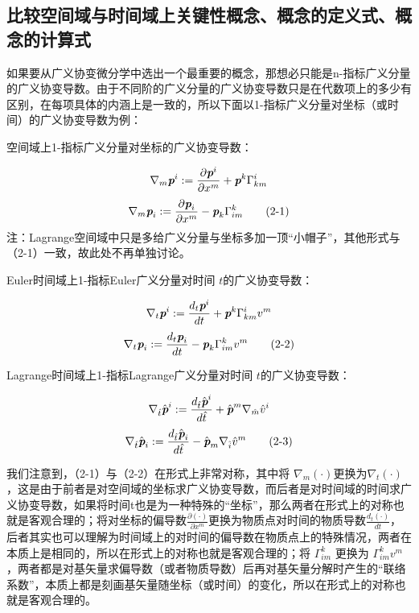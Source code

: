 \documentclass[UTF8]{ctexart}
\begin{document}
\subsection{比较空间域与时间域上关键性概念、概念的定义式、概念的计算式}
如果要从广义协变微分学中选出一个最重要的概念，那想必只能是n-指标广义分量的广义协变导数。由于不同阶的广义分量的广义协变导数只是在代数项上的多少有区别，在每项具体的内涵上是一致的，所以下面以1-指标广义分量对坐标（或时间）的广义协变导数为例：\par
空间域上1-指标广义分量对坐标的广义协变导数：\par
\begin{equation*}
    \nabla_m\textit{\textbf{p}}^i := \frac{\partial \textit{\textbf{p}}^i}{\partial x^m}+\textit{\textbf{p}}^k\Gamma_{km}^{i}
\end{equation*}
\begin{equation*}
    \nabla_m\textit{\textbf{p}}_i := \frac{\partial \textit{\textbf{p}}_i}{\partial x^m}-\textit{\textbf{p}}_k\Gamma_{im}^{k}
    \tag{2-1}
\end{equation*}
注：Lagrange空间域中只是多给广义分量与坐标多加一顶“小帽子”，其他形式与（2-1）一致，故此处不再单独讨论。\par
Euler时间域上1-指标Euler广义分量对时间 $t$的广义协变导数：\par
\begin{equation*}
    \nabla_t\textit{\textbf{p}}^i := \frac{d_t\textit{\textbf{p}}^i}{dt}+\textit{\textbf{p}}^k\Gamma_{km}^{i} v^m
\end{equation*}
\begin{equation*}
    \nabla_t\textit{\textbf{p}}_i := \frac{d_t\textit{\textbf{p}}_i}{dt}-\textit{\textbf{p}}_k\Gamma_{im}^{k} v^m
    \tag{2-2}
\end{equation*}
\par
Lagrange时间域上1-指标Lagrange广义分量对时间 $t$的广义协变导数：\par
\begin{equation*}
    \nabla_{\hat{t}} \hat{\textit{\textbf{p}}}^i := \frac{d_{\hat{t}} \hat{\textit{\textbf{p}}}^i}{d\hat{t}}+\hat{\textit{\textbf{p}}}^m\nabla_{\hat{m}} \hat{v}^i
\end{equation*}
\begin{equation*}
    \nabla_{\hat{t}}\hat{\textit{\textbf{p}}}_i := \frac{d_{\hat{t}} \hat{\textit{\textbf{p}}}_i}{d\hat{t}}-\hat{\textit{\textbf{p}}}_m \nabla_{\hat{i}} \hat{v}^m
    \tag{2-3}
\end{equation*}
\par
我们注意到，（2-1）与（2-2）在形式上非常对称，其中将 $\nabla_m(\cdot)$更换为$\nabla_t(\cdot)$，这是由于前者是对空间域的坐标求广义协变导数，而后者是对时间域的时间求广义协变导数，如果将时间t也是为一种特殊的“坐标”，那么两者在形式上的对称也就是客观合理的；将对坐标的偏导数$\frac{\partial (\cdot)}{\partial x^m}$更换为物质点对时间的物质导数$\frac{d_t (\cdot)}{dt}$，后者其实也可以理解为时间域上的对时间的偏导数在物质点上的特殊情况，两者在本质上是相同的，所以在形式上的对称也就是客观合理的；将 $\Gamma_{im}^{k}$ 更换为 $\Gamma_{im}^{k} v^m$，两者都是对基矢量求偏导数（或者物质导数）后再对基矢量分解时产生的“联络系数”，本质上都是刻画基矢量随坐标（或时间）的变化，所以在形式上的对称也就是客观合理的。\par
\end{document}
